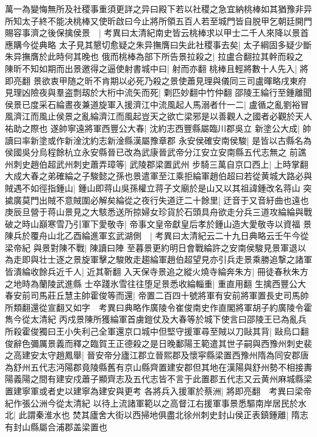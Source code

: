 萬一為變悔無所及社稷事重須更詳之异曰殿下若以社稷之急宜納桃棒如其猶豫非异所知太子終不能决桃棒又使昕啟曰今止將所領五百人若至城門皆自脱甲乞朝廷開門賜容事濟之後保擒侯景　|{
	考異曰太清紀南史皆云桃棒求以甲士二千人來降以景首應購今從典略}
太子見其懇切愈疑之朱异撫膺曰失此社稷事去矣|{
	太子綱固多疑少斷朱异撫膺於此時何其晚也}
俄而桃棒為部下所告景拉殺之|{
	拉盧合翻拉其幹而殺之}
陳昕不知如期而出景邀得之逼使射書城中曰|{
	射而亦翻}
桃棒且輕將數十人先入|{
	將即亮翻}
景欲衷甲随之昕不肯期以必死乃殺之景使蕭見理與儀同三司盧暉略戌東府見理凶險夜與羣盗剽刼於大桁中流矢而死|{
	㔄匹妙翻中竹仲翻}
邵陵王綸行至鍾離聞侯景已度采石綸晝夜兼道旋軍入援濟江中流風起人馬溺者什一二|{
	盧循之亂劉裕冒風濟江而風止侯景之亂綸濟江而風起豈天之欲亡梁邪是以善觀人之國者必觀於天人祐助之際也}
遂帥寧遠將軍西豐公大春|{
	沈約志西豐縣屬臨川郡吳立}
新塗公大成|{
	帥讀曰率新塗或作新淦沈約志新淦縣漢屬豫章郡}
永安侯確安南侯駿|{
	是皆以古縣名為侯國吳分烏程餘杭立永安縣晉已改為武康晉武帝分江安立安南縣五代志無之}
前譙州刺史趙伯超武州刺史蕭弄璋等|{
	武陵郡梁置武州}
步騎三萬自京口西上|{
	上時掌翻}
大成大春之弟確綸之子駿懿之孫也景遣軍至江乘拒綸軍趙伯超曰若從黄城大路必與賊遇不如徑指鍾山|{
	鍾山即蒋山吳孫權立蒋子文廟於是山又以其祖諱鍾改名蒋山}
突㨿廣莫門出賊不意賊圍必解矣綸從之夜行失道迂二十餘里|{
	迂音于又音紆曲也遠也}
庚辰旦營于蒋山景見之大駭悉送所掠婦女珍貨於石頭具舟欲走分兵三道攻綸綸與戰破之時山巔寒雪乃引軍下愛敬寺|{
	帝事文皇帝獻皇后孝於鍾山造大愛敬寺以資福}
景陳兵於覆舟山北乙酉綸進軍玄武湖側　|{
	考異曰太清紀云二十九日典略云壬午今從梁帝紀}
與景對陳不戰|{
	陳讀曰陣}
至暮景更約明日會戰綸許之安南侯駿見景軍退以為走即與壮士逐之景旋軍擊之駿敗走趨綸軍趙伯超望見亦引兵走景乘勝追撃之諸軍皆潰綸收餘兵近千人|{
	近其靳翻}
入天保寺景追之縱火燒寺綸奔朱方|{
	冊徒春秋朱方之地時為蘭陵武進縣}
士卒踐氷雪往往堕足景悉收綸輜重|{
	重直用翻}
生擒西豐公大春安前司馬莊丘慧主帥霍俊等而還|{
	帝置二百四十號將軍有安前將軍置長史司馬帥所類翻還從宣翻又如字　考異曰典略作廣陵令崔俊南史作直閣將軍胡子約廣陵令霍雋今從太清紀}
丙戍景陳所獲綸軍首虜鎧仗及大春等於城下使言曰邵陵王已為亂兵所殺霍俊獨曰王小失利己全軍還京口城中但堅守援軍尋至賊以刀敺其背|{
	敺烏口翻}
俊辭色彌厲景義而釋之臨賀王正德殺之是日晚鄱陽王範遣其世子嗣與西豫州刺史裴之高建安太守趙鳳舉|{
	晉安帝分廬江郡立晉熙郡及懷寜縣梁置西豫州隋為同安郡唐為舒州五代志沔陽郡竟陵縣舊有京山縣齊置建安郡但其地在漢陽與舒州勢不相接夀陽義陽之間有建安戍蕭子顯齊志及五代志皆不言于此置郡五代志又云黄州麻城縣梁置建寧軍或者史以建寧為建安與更考}
各將兵入援軍於蔡洲|{
	將即亮翻　考異曰梁帝紀作張公洲今從太清紀}
以待上流諸軍範以之高督江右援軍事景悉驅南岸居民於水北|{
	此謂秦淮水也}
焚其廬舍大街以西掃地俱盡北徐州刺史封山侯正表鎮鍾離|{
	隋志有封山縣屬合浦郡盖梁置也}

